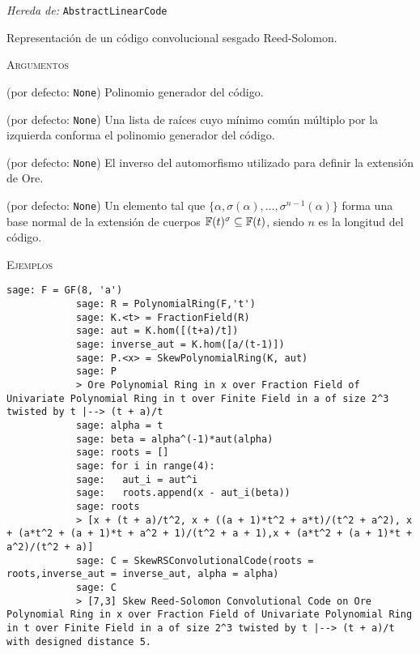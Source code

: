 \begin{description}[leftmargin=1em, font=\normalfont\ttfamily, style=nextline]
    \item[class SkewRSConvolutionalCode(self,generator\_pol=None,roots=None,inverse\_aut=None)]
    
    \emph{Hereda de: } \texttt{AbstractLinearCode}

    Representación de un código convolucional sesgado Reed-Solomon.

    \textsc{Argumentos}

    \begin{description}[font=\normalfont\ttfamily]
        \item[generator\_pol] (por defecto: \texttt{None}) Polinomio generador del código. 
        \item[roots] (por defecto: \texttt{None}) Una lista de raíces cuyo mínimo común múltiplo por la izquierda conforma el polinomio generador del código.
        \item[inverse\_aut] (por defecto: \texttt{None}) El inverso del automorfismo utilizado para definir la extensión de Ore.
        \item[alpha] (por defecto: \texttt{None}) Un elemento tal que $\{\alpha,\sigma(\alpha),\dots,\sigma^{n-1}(\alpha)\}$ forma una base normal de la extensión de cuerpos $\mathbb{F}(t)^\sigma \subseteq \mathbb{F}(t)$, siendo $n$ es la longitud del código. 
    \end{description}

    \textsc{Ejemplos}

    \begin{lstlisting}[gobble=12]
            sage: F = GF(8, 'a')
            sage: R = PolynomialRing(F,'t')
            sage: K.<t> = FractionField(R)
            sage: aut = K.hom([(t+a)/t])
            sage: inverse_aut = K.hom([a/(t-1)])
            sage: P.<x> = SkewPolynomialRing(K, aut)
            sage: P
            > Ore Polynomial Ring in x over Fraction Field of Univariate Polynomial Ring in t over Finite Field in a of size 2^3 twisted by t |--> (t + a)/t
            sage: alpha = t
            sage: beta = alpha^(-1)*aut(alpha)
            sage: roots = []
            sage: for i in range(4):
            sage:   aut_i = aut^i
            sage:   roots.append(x - aut_i(beta))
            sage: roots 
            > [x + (t + a)/t^2, x + ((a + 1)*t^2 + a*t)/(t^2 + a^2), x + (a*t^2 + (a + 1)*t + a^2 + 1)/(t^2 + a + 1),x + (a*t^2 + (a + 1)*t + a^2)/(t^2 + a)]
            sage: C = SkewRSConvolutionalCode(roots = roots,inverse_aut = inverse_aut, alpha = alpha) 
            sage: C
            > [7,3] Skew Reed-Solomon Convolutional Code on Ore Polynomial Ring in x over Fraction Field of Univariate Polynomial Ring in t over Finite Field in a of size 2^3 twisted by t |--> (t + a)/t with designed distance 5.
    \end{lstlisting}


\end{description}
